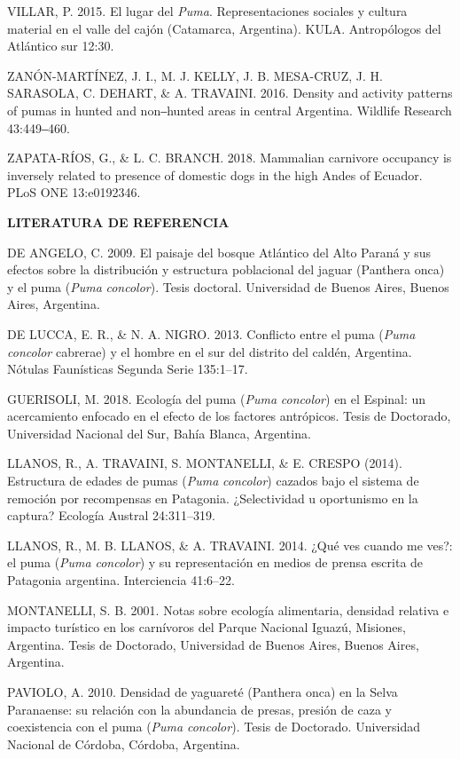 \documentclass[
  x11names]{article}
\begin{document}
VILLAR, P. 2015. El lugar del \textit{Puma}. Representaciones sociales y
cultura material en el valle del cajón (Catamarca, Argentina). KULA.
Antropólogos del Atlántico sur 12:30.

ZANÓN-MARTÍNEZ, J. I., M. J. KELLY, J. B. MESA-CRUZ, J. H. SARASOLA, C.
DEHART, \& A. TRAVAINI. 2016. Density and activity patterns of pumas in
hunted and non‒hunted areas in central Argentina. Wildlife Research
43:449‒460.

ZAPATA-RÍOS, G., \& L. C. BRANCH. 2018. Mammalian carnivore occupancy is
inversely related to presence of domestic dogs in the high Andes of
Ecuador. PLoS ONE 13:e0192346.

\noindent\textbf{LITERATURA DE REFERENCIA}

DE ANGELO, C. 2009. El paisaje del bosque Atlántico del Alto Paraná y
sus efectos sobre la distribución y estructura poblacional del jaguar
(Panthera onca) y el puma (\textit{Puma} \textit{concolor}). Tesis
doctoral. Universidad de Buenos Aires, Buenos Aires, Argentina.

DE LUCCA, E. R., \& N. A. NIGRO. 2013. Conflicto entre el puma
(\textit{Puma} \textit{concolor} cabrerae) y el hombre en el sur del
distrito del caldén, Argentina. Nótulas Faunísticas Segunda Serie
135:1--17.

GUERISOLI, M. 2018. Ecología del puma (\textit{Puma} \textit{concolor})
en el Espinal: un acercamiento enfocado en el efecto de los factores
antrópicos. Tesis de Doctorado, Universidad Nacional del Sur, Bahía
Blanca, Argentina.

LLANOS, R., A. TRAVAINI, S. MONTANELLI, \& E. CRESPO (2014). Estructura
de edades de pumas (\textit{Puma} \textit{concolor}) cazados bajo el
sistema de remoción por recompensas en Patagonia. ¿Selectividad u
oportunismo en la captura? Ecología Austral 24:311--319.

LLANOS, R., M. B. LLANOS, \& A. TRAVAINI. 2014. ¿Qué ves cuando me ves?:
el puma (\textit{Puma} \textit{concolor}) y su representación en medios
de prensa escrita de Patagonia argentina. Interciencia 41:6--22.

MONTANELLI, S. B. 2001. Notas sobre ecología alimentaria, densidad
relativa e impacto turístico en los carnívoros del Parque Nacional
Iguazú, Misiones, Argentina. Tesis de Doctorado, Universidad de Buenos
Aires, Buenos Aires, Argentina.

PAVIOLO, A. 2010. Densidad de yaguareté (Panthera onca) en la Selva
Paranaense: su relación con la abundancia de presas, presión de caza y
coexistencia con el puma (\textit{Puma} \textit{concolor}). Tesis de
Doctorado. Universidad Nacional de Córdoba, Córdoba, Argentina.
\end{document}
